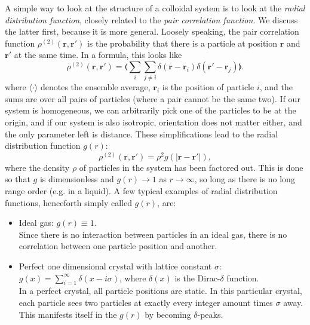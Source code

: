 \documentclass[thesis]{subfiles}
\begin{document}
A simple way to look at the structure of a colloidal system is to look at the \emph{radial distribution function}, closely related to the \emph{pair correlation function}. We discuss the latter first, because it is more general. Loosely speaking, the pair correlation function $\rho^{(2)}(\bm r, \bm r')$ is the probability that there is a particle at position $\bm r$ and $\bm r'$ at the same time. In a formula, this looks like 
\begin{equation}
	\rho^{(2)}(\bm r, \bm r') = \llangle \sum_i \sum_{j \neq i} \delta(\bm r - \bm r_i) \delta(\bm r' - \bm r_j) \rrangle.
\end{equation}
where $\langle \cdot \rangle$ denotes the ensemble average, $\bm r_i$ is the position of particle $i$, and the sums are over all pairs of particles (where a pair cannot be the same two).
If our system is homogeneous, we can arbitrarily pick one of the particles to be at the origin, and if our system is also isotropic, orientation does not matter either, and the only parameter left is distance. These simplifications lead to the radial distribution function $g(r):$
\begin{equation}
	\rho^{(2)}(\bm r, \bm r') = \rho^2 g(|\bm r - \bm r'|),
\end{equation}
where the density $\rho$ of particles in the system has been factored out. This is done so that $g$ is dimensionless and $g(r) \rightarrow 1$ as $r \rightarrow \infty$, so long as there is no long range order (e.g. in a liquid). A few typical examples of radial distribution functions, henceforth simply called $g(r)$, are:


\begin{itemize}
	\item Ideal gas: $g(r) \equiv 1$.\\
	Since there is no interaction between particles in an ideal gas, there is no correlation between one particle position and another.
\begin{comment}
	\item Dilute gas of hard spheres of diameter $\sigma$: $g(r) = \begin{cases} 0 & \textrm{if } r < \sigma, \\ 1 & \textrm{else.} \end{cases}$\\
	Since hard spheres cannot overlap, we won't find any within one diameter of another (hence the $g(r)$ is zero there). But because the gas is dilute, there is very little interaction, and it'll be equally likely to find a sphere anywhere else.
\end{comment}
	\item Perfect one dimensional crystal with lattice constant $\sigma$: $g(x) = \sum_{i = 1}^\infty \delta(x - i\sigma)$, where $\delta(x)$ is the Dirac-$\delta$ function.\\
	In a perfect crystal, all particle positions are static. In this particular crystal, each particle sees two particles at exactly every integer amount times $\sigma$ away. This manifests itself in the $g(r)$ by becoming $\delta$-peaks.
\end{itemize}
\end{document}
